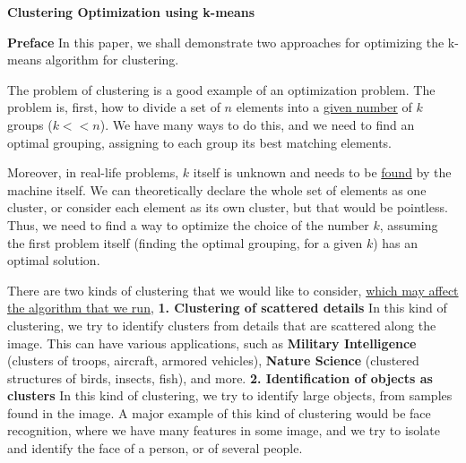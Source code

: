 \documentclass[12pt]{article}
\begin{document}
\onehalfspacing
\textbf{Clustering Optimization using k-means} \newline

\textbf{Preface} \newline
In this paper, we shall demonstrate two approaches for optimizing the \newline
k-means algorithm for clustering. \newline

The problem of clustering is a good example of an optimization problem. \newline 
The problem is, first, how to divide a set of $n$ elements into a \underline{given number} of $k$ groups ($k << n$). We have many ways to do this, and we need to find an optimal grouping, assigning to each group its best matching elements. \newline

Moreover, in real-life problems, $k$ itself is unknown and needs to be \underline{found} by the machine itself. We can theoretically declare the whole set of elements as one cluster, or consider each element as its own cluster, but that would be pointless. Thus, we need to find a way to optimize the choice of the number $k$, assuming the first problem itself (finding the optimal grouping, for a given $k$) has an optimal solution. \newline

There are two kinds of clustering that we would like to consider, \newline
\underline{which may affect the algorithm that we run}, \newline \newline
\textbf{1. Clustering of scattered details} \newline
In this kind of clustering, we try to identify clusters from details that are scattered along the image.
This can have various applications, such as \newline \textbf{Military Intelligence} (clusters of troops, aircraft, armored vehicles), \newline
\textbf{Nature Science} (clustered structures of birds, insects, fish), and more.
\newpage
\textbf{2. Identification of objects as clusters} \newline
In this kind of clustering, we try to identify large objects, from samples found in the image. A major example of this kind of clustering would be face recognition, 
where we have many features in some image, and we try to isolate and
identify the face of a person, or of several people. \newline
\end{document}
